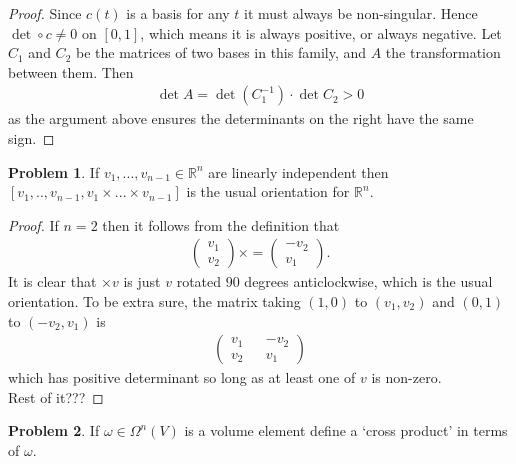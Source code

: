 \documentclass[20pt]{article}
\theoremstyle{plain}
\theoremstyle{definition}
\newtheorem*{problem}{Problem}
\newcommand{\reals}{\mathbb{R}}
\begin{document}
\begin{proof}
  Since $c(t)$ is a basis for any $t$ it must always be non-singular.
  Hence $\det \circ c \neq 0$ on $[0, 1]$, which means it is always 
  positive, or always negative.
  Let $C_1$ and $C_2$ be the matrices of two bases in this family, and $A$ the transformation between them. 
  Then 
  \begin{align*}
    \det A = \det(C^{-1}_1) \cdot \det C_2 > 0
  \end{align*}
  as the argument above ensures the determinants on the right have the same sign.
\end{proof}




\begin{problem}{4.6}
  If $v_1, ..., v_{n-1} \in \reals^n$ are linearly independent then 
  $[v_1, .., v_{n-1}, v_1 \times ... \times v_{n-1}]$ is the usual 
  orientation for $\reals^n$.
\end{problem}
\begin{proof}
  If $n=2$ then it follows from the definition that 
  \begin{align*}
    \begin{pmatrix}
      v_1 \\ v_2
    \end{pmatrix}
    \times = 
    \begin{pmatrix}
      -v_2 \\ v_1
    \end{pmatrix}.
  \end{align*}
  It is clear that $\times v$ is just $v$ rotated $90$ degrees anticlockwise,
  which is the usual orientation.   To be extra sure, the matrix taking 
  $(1, 0)$ to $(v_1, v_2)$ and $(0, 1)$ to $(-v_2, v_1)$ is 
  \begin{align*}
    \begin{pmatrix}
      v_1 && -v_2 \\ v_2 && v_1
    \end{pmatrix}
  \end{align*}
  which has positive determinant so long as at least one of $v$ is non-zero. \\
  \color{ForestGreen} Rest of it???
\end{proof}




\begin{problem}{4.8}
  If $\omega \in \Omega^n(V)$ is a volume element define a `cross product' in terms of $\omega$.
\end{problem}
\end{document}
